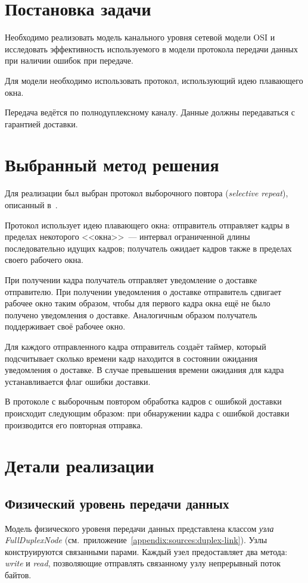 \documentclass[a4paper,10pt]{article}
\newcommand{\myfunc}[1]{%
\textit{#1}}
\begin{document}


\tableofcontents
\pagebreak


\section{Постановка задачи}
Необходимо реализовать модель канального уровня сетевой модели OSI
и исследовать эффективность используемого в модели протокола передачи данных 
при наличии ошибок при передаче.

Для модели необходимо использовать протокол, 
использующий идею плавающего окна.

Передача ведётся по полнодуплексному каналу.
Данные должны передаваться с гарантией доставки.

\section{Выбранный метод решения}
\label{section:solution}
Для реализации был выбран протокол выборочного повтора (\textit{selective repeat}), 
описанный в~\cite{tanenbaum2003compnet}.

Протокол использует идею плавающего окна:
отправитель отправляет кадры в пределах некоторого <<окна>>~--- 
интервал ограниченной длины последовательно идущих кадров;
получатель ожидает кадров также в пределах своего рабочего окна.

При получении кадра получатель отправляет уведомление о доставке 
отправителю.
При получении уведомления о доставке отправитель сдвигает рабочее окно
таким образом, чтобы для первого кадра окна ещё не было получено
уведомления о доставке.
Аналогичным образом получатель поддерживает своё рабочее окно.

Для каждого отправленного кадра отправитель создаёт таймер, 
который подсчитывает сколько времени кадр находится в состоянии ожидания
уведомления о доставке.
В случае превышения времени ожидания для кадра устанавливается флаг ошибки доставки.

В протоколе с выборочным повтором обработка кадров с ошибкой доставки 
происходит следующим образом:
при обнаружении кадра с ошибкой доставки производится его повторная отправка.

\section{Детали реализации}
\subsection{Физический уровень передачи данных}
Модель физического уровеня передачи данных представлена 
классом \textit{узла} \myfunc{FullDuplexNode}
(см.~приложение~\ref{appendix:sources:duplex-link}).
Узлы конструируются связанными парами.
Каждый узел предоставляет два метода: \myfunc{write} и \myfunc{read}, 
позволяющие отправлять связанному узлу непрерывный поток байтов.
\end{document}
